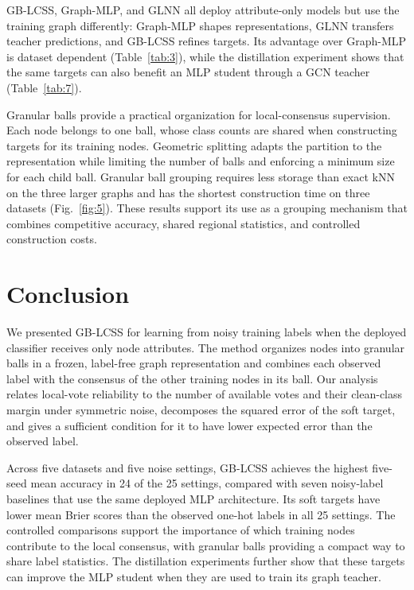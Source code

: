 \documentclass[times,review,10pt]{elsarticle}
\theoremstyle{definition}
\theoremstyle{plain}
\begin{document}
GB-LCSS, Graph-MLP, and GLNN all deploy attribute-only models but use the training graph differently: Graph-MLP shapes representations, GLNN transfers teacher predictions, and GB-LCSS refines targets. Its advantage over Graph-MLP is dataset dependent (Table~\ref{tab:3}), while the distillation experiment shows that the same targets can also benefit an MLP student through a GCN teacher (Table~\ref{tab:7}).

Granular balls provide a practical organization for local-consensus supervision. Each node belongs to one ball, whose class counts are shared when constructing targets for its training nodes. Geometric splitting adapts the partition to the representation while limiting the number of balls and enforcing a minimum size for each child ball. Granular ball grouping requires less storage than exact kNN on the three larger graphs and has the shortest construction time on three datasets (Fig.~\ref{fig:5}). These results support its use as a grouping mechanism that combines competitive accuracy, shared regional statistics, and controlled construction costs.

\section{Conclusion}\label{sec:5}

We presented GB-LCSS for learning from noisy training labels when the deployed classifier receives only node attributes. The method organizes nodes into granular balls in a frozen, label-free graph representation and combines each observed label with the consensus of the other training nodes in its ball. Our analysis relates local-vote reliability to the number of available votes and their clean-class margin under symmetric noise, decomposes the squared error of the soft target, and gives a sufficient condition for it to have lower expected error than the observed label.

Across five datasets and five noise settings, GB-LCSS achieves the highest five-seed mean accuracy in 24 of the 25 settings, compared with seven noisy-label baselines that use the same deployed MLP architecture. Its soft targets have lower mean Brier scores than the observed one-hot labels in all 25 settings. The controlled comparisons support the importance of which training nodes contribute to the local consensus, with granular balls providing a compact way to share label statistics. The distillation experiments further show that these targets can improve the MLP student when they are used to train its graph teacher.
\end{document}
